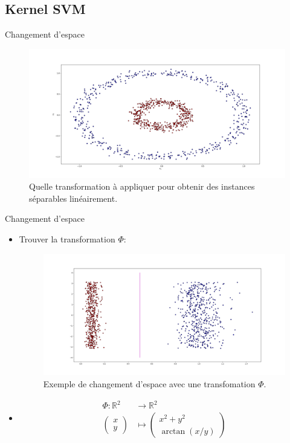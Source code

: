 \documentclass[8pt]{beamer}
\begin{document}
	\subsection[kernel]{Kernel SVM}

	\begin{frame}{Changement d'espace}
		\begin{figure}[H]
			\begin{center}
				\includegraphics[width=.7\textwidth]{images/samples/circles}
				\caption{\label{fig::circles_3} Quelle transformation à appliquer pour obtenir des instances séparables linéairement.}
			\end{center}
		\end{figure}
	\end{frame}
	\begin{frame}[plain]{Changement d'espace}
		\begin{itemize}
			\item  Trouver la transformation $\Phi$:
			\begin{figure}[H]
				\includegraphics[width=.7\textwidth]{images/samples/separation_pol}
				\caption{\label{fig::kernel_polar} Exemple de changement d'espace avec une transfomation $\Phi$.}
			\end{figure}
			\item  \begin{align*}
				\Phi: \mathbb{R}^2 &\rightarrow \mathbb{R}^2 \\
				\begin{pmatrix}
					x \\
					y
				\end{pmatrix} &\mapsto \begin{pmatrix}
					x^2 + y^2 \\
					\arctan(x/y)
				\end{pmatrix}
			\end{align*}
		\end{itemize}
	\end{frame}
\end{document}
